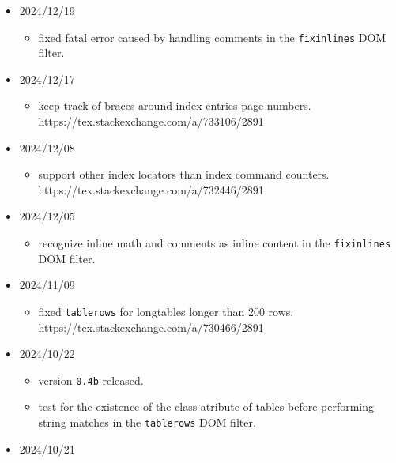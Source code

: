 \begin{itemize}
  \begin{itemize}
  \tightlist
  \item
    remove duplicate index locators in the \texttt{make4ht-indexing}
    library. https://tex.stackexchange.com/a/733106/2891
  \end{itemize}
\item
  2024/12/19

  \begin{itemize}
  \tightlist
  \item
    fixed fatal error caused by handling comments in the
    \texttt{fixinlines} DOM filter.
  \end{itemize}
\item
  2024/12/17

  \begin{itemize}
  \tightlist
  \item
    keep track of braces around index entries page numbers.
    https://tex.stackexchange.com/a/733106/2891
  \end{itemize}
\item
  2024/12/08

  \begin{itemize}
  \tightlist
  \item
    support other index locators than index command counters.
    https://tex.stackexchange.com/a/732446/2891
  \end{itemize}
\item
  2024/12/05

  \begin{itemize}
  \tightlist
  \item
    recognize inline math and comments as inline content in the
    \texttt{fixinlines} DOM filter.
  \end{itemize}
\item
  2024/11/09

  \begin{itemize}
  \tightlist
  \item
    fixed \texttt{tablerows} for longtables longer than 200 rows.
    https://tex.stackexchange.com/a/730466/2891
  \end{itemize}
\item
  2024/10/22

  \begin{itemize}
  \tightlist
  \item
    version \texttt{0.4b} released.
  \item
    test for the existence of the class atribute of tables before
    performing string matches in the \texttt{tablerows} DOM filter.
  \end{itemize}
\item
  2024/10/21


\end{itemize}
